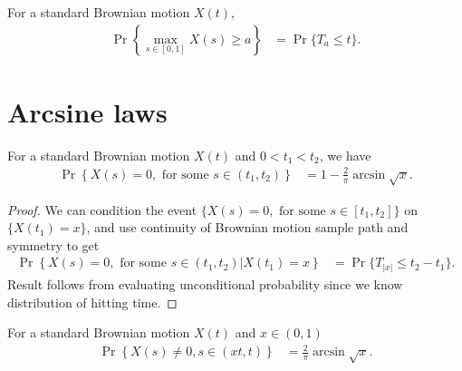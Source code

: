 \documentclass[a4paper,10pt,english]{article}
\begin{document}
\begin{rem} For a standard Brownian motion $X(t)$, 
\begin{align*}
\Pr\left\{\max_{s \in [0,1]}X(s) \geq a \right\} &= \Pr\{T_a \leq t\}.
\end{align*}
\end{rem}

\section{Arcsine laws}
\begin{thm} For a standard Brownian motion $X(t)$ and $0 < t_1 < t_2$, we have
\begin{align*}
\Pr\left\{  X(s) = 0, \text{ for some }s \in (t_1,t_2) \right\} &= 1 - \frac{2}{\pi}\arcsin\sqrt{x}.
\end{align*}
\end{thm}
\begin{proof} We can condition the event $\{ X(s) = 0, \text{ for some }s \in [t_1,t_2] \}$ on $\{X(t_1) = x\}$, and use continuity of Brownian motion sample path and symmetry to get
\begin{align*}
\Pr\left\{X(s) = 0, \text{ for some }s \in (t_1,t_2) | X(t_1) = x\right\} &= \Pr\{T_{|x|} \leq t_2 - t_1\}.
\end{align*}
Result follows from evaluating unconditional probability since we know distribution of hitting time.
\end{proof}

\begin{cor} For a standard Brownian motion $X(t)$ and $x \in (0,1)$
\begin{align*}
\Pr\left\{  X(s) \neq 0, s \in (xt,t) \right\} &= \frac{2}{\pi}\arcsin\sqrt{x}.
\end{align*}
\end{cor}
\end{document}
